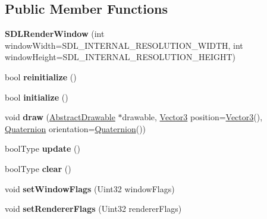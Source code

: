 \subsection*{Public Member Functions}
\begin{DoxyCompactItemize}
\item 
\hypertarget{classSDLRenderWindow_ab5f90f3620ece09e4d920de9c1a1abb0}{{\bfseries S\-D\-L\-Render\-Window} (int window\-Width=S\-D\-L\-\_\-\-I\-N\-T\-E\-R\-N\-A\-L\-\_\-\-R\-E\-S\-O\-L\-U\-T\-I\-O\-N\-\_\-\-W\-I\-D\-T\-H, int window\-Height=S\-D\-L\-\_\-\-I\-N\-T\-E\-R\-N\-A\-L\-\_\-\-R\-E\-S\-O\-L\-U\-T\-I\-O\-N\-\_\-\-H\-E\-I\-G\-H\-T)}\label{classSDLRenderWindow_ab5f90f3620ece09e4d920de9c1a1abb0}

\item 
\hypertarget{classSDLRenderWindow_a6fdc3114e5607379245d4c620cf59478}{bool {\bfseries reinitialize} ()}\label{classSDLRenderWindow_a6fdc3114e5607379245d4c620cf59478}

\item 
\hypertarget{classSDLRenderWindow_a6dd443adad5bcca27614f604e21e2ecc}{bool {\bfseries initialize} ()}\label{classSDLRenderWindow_a6dd443adad5bcca27614f604e21e2ecc}

\item 
\hypertarget{classSDLRenderWindow_ae9ef6cd21803be4de3d35aa423555bb0}{void {\bfseries draw} (\hyperlink{classAbstractDrawable}{Abstract\-Drawable} $\ast$drawable, \hyperlink{classVector3}{Vector3} position=\hyperlink{classVector3}{Vector3}(), \hyperlink{classQuaternion}{Quaternion} orientation=\hyperlink{classQuaternion}{Quaternion}())}\label{classSDLRenderWindow_ae9ef6cd21803be4de3d35aa423555bb0}

\item 
\hypertarget{classSDLRenderWindow_aacbeb41b7514e3df4d24084540382f85}{bool\-Type {\bfseries update} ()}\label{classSDLRenderWindow_aacbeb41b7514e3df4d24084540382f85}

\item 
\hypertarget{classSDLRenderWindow_a4393abb2f47b90cdf3f31c058e36b4aa}{bool\-Type {\bfseries clear} ()}\label{classSDLRenderWindow_a4393abb2f47b90cdf3f31c058e36b4aa}

\item 
\hypertarget{classSDLRenderWindow_a05c8308a6858e170840908668e73e028}{void {\bfseries set\-Window\-Flags} (Uint32 window\-Flags)}\label{classSDLRenderWindow_a05c8308a6858e170840908668e73e028}

\item 
\hypertarget{classSDLRenderWindow_a2bb9f04dc25360c5e4da04c4c3ed6f7d}{void {\bfseries set\-Renderer\-Flags} (Uint32 renderer\-Flags)}\label{classSDLRenderWindow_a2bb9f04dc25360c5e4da04c4c3ed6f7d}


\end{DoxyCompactItemize}
